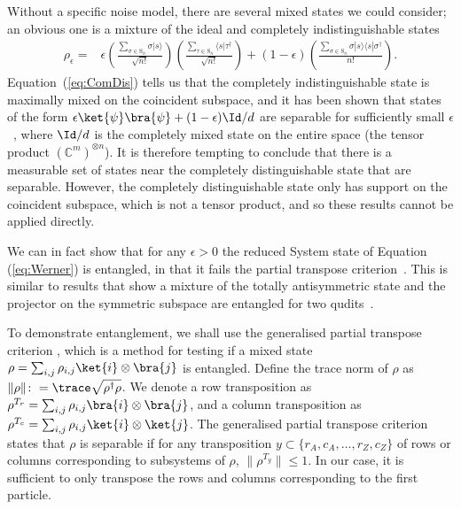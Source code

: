 Without a specific noise model, there are several mixed states we could consider; an obvious one is a mixture of the ideal and completely indistinguishable states
\begin{align}
\label{eq:Werner}
\rho_\epsilon 
=& \epsilon\left(\frac{\sum_{\sigma \in  \textrm{S}_n}\sigma|s\rangle}{\sqrt{n!}}\right)\left(\frac{\sum_{\tau \in  \textrm{S}_n}\langle s|\tau^\dagger}{\sqrt{n!}}\right) + (1-\epsilon)\left(\frac{\sum_{\sigma \in  \textrm{S}_n}\sigma|s\rangle\langle s|\sigma^\dagger}{{n!}}\right).
\end{align}
Equation~(\ref{eq:ComDis}) tells us that the completely indistinguishable state is maximally mixed on the coincident subspace, and it has been shown that states of the form $\epsilon\ket{\psi}\bra{\psi} + (1-\epsilon)\Id/d$ are separable for sufficiently small $\epsilon$~\cite{braunstein1999, rungta2001}, where $\Id/d$ is the completely mixed state on the entire space (the tensor product $(\mathbb{C}^m)^{\otimes n}$).
It is therefore tempting to conclude that there is a measurable set of states near the completely distinguishable state that are separable.
However, the completely distinguishable state only has support on the coincident subspace, which is not a tensor product, and so these results cannot be applied directly.

We can in fact show that for any $\epsilon>0$ the reduced System state of Equation (\ref{eq:Werner}) is entangled, in that it fails the partial transpose criterion~\cite{chen2002}.
This is similar to results that show a mixture of the totally antisymmetric state and the projector on the symmetric subspace are entangled for two qudits~\cite{breuer2006}.

To demonstrate entanglement, we shall use the generalised partial transpose criterion \cite{chen2002}, which is a method for testing if a mixed state $\rho = \sum_{i,j}\rho_{i,j}\ket{i}\otimes\bra{j}$ is entangled. Define the trace norm of $\rho$ as $\|\rho\| \colon= \trace\sqrt{\rho^\dagger\rho}$. We denote a row transposition as $\rho^{T_{r}} = \sum_{i,j}\rho_{i,j}\bra{i}\otimes\bra{j}$, and a column transposition as $\rho^{T_{c}} = \sum_{i,j}\rho_{i,j}\ket{i}\otimes\ket{j}$. The generalised partial transpose criterion states that $\rho$ is separable if for any transposition $y \subset \{r_A,c_A,\dots,r_Z,c_Z\}$ of rows or columns corresponding to subsystems of $\rho$, $\|\rho^{T_y}\| \leq 1$. In our case, it is sufficient to only transpose the rows and columns corresponding to the first particle.

